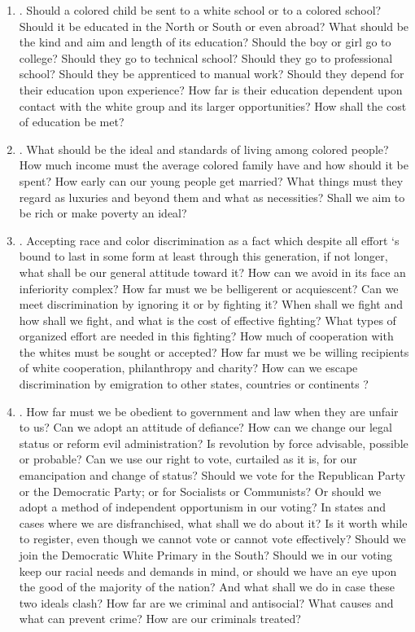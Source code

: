 \documentclass[letterpaper,10pt,english]{jupyterBook}
\begin{document}
\begin{enumerate}
\item {} 
\sphinxAtStartPar
{}. Should a colored child be sent to a white school or to a colored school? Should it be educated in the North or South or even abroad? What should be the kind and aim and length of its education? Should the boy or girl go to college? Should they go to technical school? Should they go to professional school? Should they be apprenticed to manual work? Should they depend for their education upon experience? How far is their education dependent upon contact with the white group and its larger opportunities? How shall the cost of education be met?

\item {} 
\sphinxAtStartPar
{}. What should be the ideal and standards of living among colored people? How much income must the average colored family have and how should it be spent? How early can our young people get married? What things must they regard as luxuries and beyond them and what as necessities? Shall we aim to be rich or make poverty an ideal?

\item {} 
\sphinxAtStartPar
{}. Accepting race and color discrimination as a fact which despite all effort ‘s bound to last in some form at least through this generation, if not longer, what shall be our general attitude toward it? How can we avoid in its face an inferiority complex? How far must we be belligerent or acquiescent? Can we meet discrimination by ignoring it or by fighting it? When shall we fight and how shall we fight, and what is the cost of effective fighting? What types of organized effort are needed in this fighting? How much of co\sphinxhyphen{}operation with the whites must be sought or accepted? How far must we be willing recipients of white co\sphinxhyphen{}operation, philanthropy and charity? How can we escape discrimination by emigration to other states, countries or continents ?

\item {} 
\sphinxAtStartPar
{}. How far must we be obedient to government and law when they are unfair to us? Can we adopt an attitude of defiance? How can we change our legal status or reform evil administration? Is revolution by force advisable, possible or probable? Can we use our right to vote, curtailed as it is, for our emancipation and change of status? Should we vote for the Republican Party or the Democratic Party; or for Socialists or Communists? Or should we adopt a method of independent opportunism in our voting? In states and cases where we are disfranchised, what shall we do about it? Is it worth while to register, even though we cannot vote or cannot vote effectively? Should we join the Democratic White Primary in the South? Should we in our voting keep our racial needs and demands in mind, or should we have an eye upon the good of the majority of the nation? And what shall we do in case these two ideals clash? How far are we criminal and antisocial? What causes and what can prevent crime? How are our criminals treated?


\end{enumerate}
\end{document}
